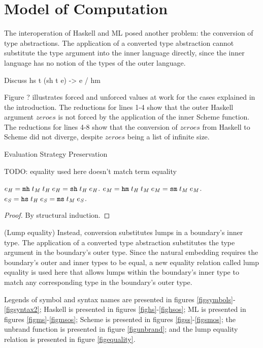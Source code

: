 \section{Model of Computation}

The interoperation of Haskell and ML posed another problem: the conversion of type abstractions. The application of a converted type abstraction cannot substitute the type argument into the inner language directly, since the inner language has no notion of the types of the outer language.

Discuss hs t (sh t e) -> e / hm

Figure ? illustrates forced and unforced values at work for the cases explained in the introduction. The reductions for lines 1-4 show that the outer Haskell argument $zeroes$ is not forced by the application of the inner Scheme function. The reductions for lines 4-8 show that the conversion of $zeroes$ from Haskell to Scheme did not diverge, despite $zeroes$ being a list of infinite size.

\begin{theorem}{Evaluation Strategy Preservation}

TODO: equality used here doesn't match term equality

\label{thmstr}
$e_{\mathit{H}} = \mathtt{mh} \; t_{\mathit{M}} \; t_{\mathit{H}} \; e_{\mathit{H}} = \mathtt{sh} \; t_{\mathit{H}} \; e_{\mathit{H}}$.
$e_{\mathit{M}} = \mathtt{hm} \; t_{\mathit{H}} \; t_{\mathit{M}} \; e_{\mathit{M}} = \mathtt{sm} \; t_{\mathit{M}} \; e_{\mathit{M}}$.
$e_{\mathit{S}} = \mathtt{hs} \; t_{\mathit{H}} \; e_{\mathit{S}} = \mathtt{ms} \; t_{\mathit{M}} \; e_{\mathit{S}}$.
\begin{proof}
By structural induction.
\end{proof}
\end{theorem}

(Lump equality) Instead, conversion substitutes lumps in a boundary's inner type. The application of a converted type abstraction substitutes the type argument in the boundary's outer type. Since the natural embedding \cite{matthews07} requires the boundary's outer and inner types to be equal, a new equality relation called lump equality is used here that allows lumps within the boundary's inner type to match any corresponding type in the boundary's outer type.

Legends of symbol and syntax names are presented in figures \ref{figsymbols}-\ref{figsyntax2}; Haskell is presented in figures \ref{fighs}-\ref{fighsos}; ML is presented in figures \ref{figms}-\ref{figmsos}; Scheme is presented in figures \ref{figss}-\ref{figsmos}; the unbrand function is presented in figure \ref{figunbrand}; and the lump equality relation is presented in figure \ref{figequality}.

